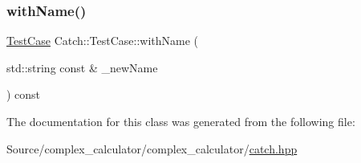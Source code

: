 \subsubsection{\texorpdfstring{with\+Name()}{withName()}}
{\footnotesize\ttfamily \mbox{\hyperlink{class_catch_1_1_test_case}{Test\+Case}} Catch\+::\+Test\+Case\+::with\+Name (\begin{DoxyParamCaption}\item[{std\+::string const \&}]{\+\_\+new\+Name }\end{DoxyParamCaption}) const}



The documentation for this class was generated from the following file\+:\begin{DoxyCompactItemize}
\item 
Source/complex\+\_\+calculator/complex\+\_\+calculator/\mbox{\hyperlink{catch_8hpp}{catch.\+hpp}}\end{DoxyCompactItemize}
